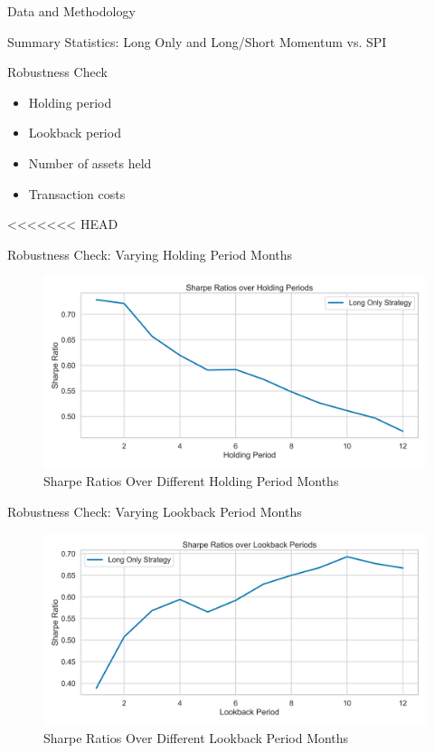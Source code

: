 \documentclass[10pt]{beamer}
\begin{document}
\begin{frame}[fragile]{Data and Methodology}
\begin{frame}{Summary Statistics: Long Only and Long/Short Momentum vs. SPI}
\begin{frame}{Robustness Check}
\begin{itemize}
    \item Holding period
    \item Lookback period
    \item Number of assets held
    \item Transaction costs    
\end{itemize}
\end{frame}

<<<<<<< HEAD
\begin{frame}{Robustness Check: Varying Holding Period Months}
  \begin{figure}
   \caption{Sharpe Ratios Over Different Holding Period Months}
        \centering
        \includegraphics[width=\linewidth]{figures/rc_holding_period.png}
    \end{figure}
\end{frame}

\begin{frame}{Robustness Check: Varying Lookback Period Months}
  \begin{figure}
   \caption{Sharpe Ratios Over Different Lookback Period Months}
        \centering
        \includegraphics[width=\linewidth]{figures/rc_lookback_period.png}
    \end{figure}
\end{frame}


\end{frame}
\end{frame}
\end{document}
